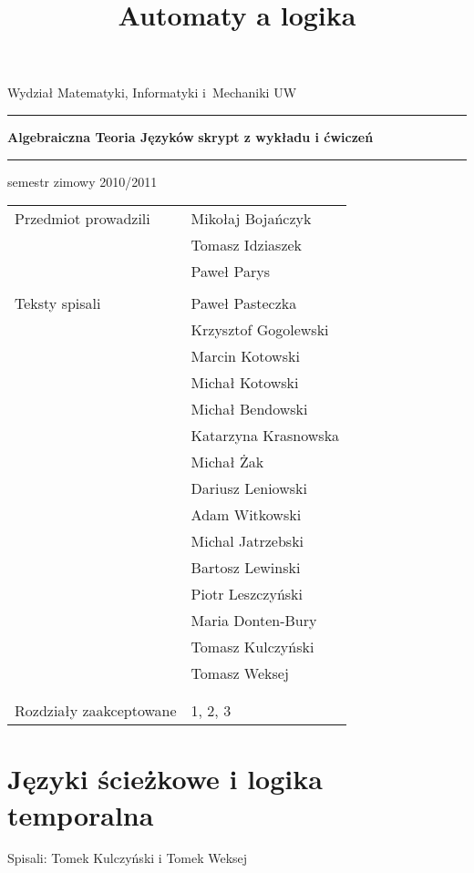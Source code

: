 \documentclass{book}
\title{Automaty a logika}
\newcommand{\spisali}[1]{\vspace{-1,2cm} Spisali: #1
\vspace{1cm}}
\newcommand{\HRule}{\rule{\linewidth}{0.2mm}}
\begin{document}
\pagestyle{plain}
\thispagestyle{empty}

\begin{center}

\textsf{\Large Wydział Matematyki, Informatyki i~Mechaniki UW}
\vskip 2.5cm

\HRule \vskip 0.5cm
{\Huge \bfseries \textsf{Algebraiczna Teoria Języków}}
\linebreak \vskip 0.2cm 
{\large \bfseries \textsf{skrypt z wykładu i ćwiczeń}}
\vskip 0.1cm
\HRule \vskip 2.5cm

{\large \textsf{semestr zimowy 2010/2011}}
\end{center}
\vfill
\newpage
\thispagestyle{empty}
\begin{center}
\begin{tabular}[width=\textwidth]{ l l}
 {Przedmiot prowadzili} & Mikołaj Bojańczyk\\ & Tomasz Idziaszek\\&  Paweł Parys
    \\ \\
{Teksty spisali}
 & Paweł Pasteczka\\
 & Krzysztof Gogolewski \\
 & Marcin Kotowski \\
 & Michał Kotowski \\
 & Michał Bendowski \\
 & Katarzyna Krasnowska \\
 & Michał Żak \\
 & Dariusz Leniowski \\
 & Adam Witkowski \\
 & Michal Jatrzebski \\
 & Bartosz Lewinski \\
 & Piotr Leszczyński \\
 & Maria Donten-Bury \\
 & Tomasz Kulczyński \\
 & Tomasz Weksej \\
 \\ \\
 {Rozdziały zaakceptowane} & 1, 2, 3
\end{tabular}
\end{center}
\newpage



\tableofcontents

\chapter{Języki ścieżkowe i logika temporalna}
\spisali{Tomek Kulczyński i Tomek Weksej}


\end{document}
